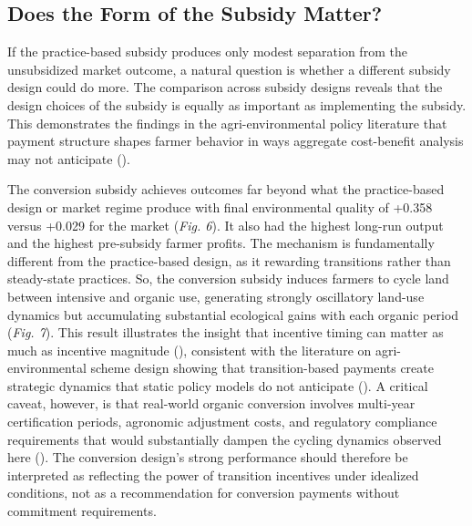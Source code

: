 \documentclass{article}
\begin{document}
\subsection{Does the Form of the Subsidy Matter?}

If the practice-based subsidy produces only modest separation from the unsubsidized market outcome, a natural question is whether a different subsidy design could do more. The comparison across subsidy designs reveals that the design choices of the subsidy is equally as important as implementing the subsidy. This demonstrates the  findings in the agri-environmental policy literature that payment structure shapes farmer behavior in ways aggregate cost-benefit analysis may not anticipate (\cite{pannell2008public, brady2012abm}).

The conversion subsidy achieves outcomes far beyond what the practice-based design or market regime produce with final environmental quality of +0.358 versus +0.029 for the market (\textit{Fig. 6}). It also had the highest long-run output and the highest pre-subsidy farmer profits. The mechanism is fundamentally different from the practice-based design, as it rewarding transitions rather than steady-state practices. So, the conversion subsidy induces farmers to cycle land between intensive and organic use, generating strongly oscillatory land-use dynamics but accumulating substantial ecological gains with each organic period (\textit{Fig. 7}). This result illustrates the insight that incentive timing can matter as much as incentive magnitude (\cite{pannell2008public}), consistent with the literature on agri-environmental scheme design showing that transition-based payments create strategic dynamics that static policy models do not anticipate (\cite{brady2012abm, baldi2025cap}). A critical caveat, however, is that real-world organic conversion involves multi-year certification periods, agronomic adjustment costs, and regulatory compliance requirements that would substantially dampen the cycling dynamics observed here (\cite{pannell2006landholders}). The conversion design's strong performance should therefore be interpreted as reflecting the power of transition incentives under idealized conditions, not as a recommendation for conversion payments without commitment requirements.
\end{document}
